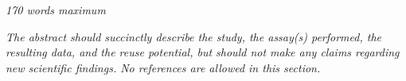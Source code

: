 \textit{170 words maximum}

\textit{The abstract should succinctly describe the study, the assay(s) performed, the resulting data, and the reuse potential, but should not make any claims regarding new scientific findings.  No references are allowed in this section.}




